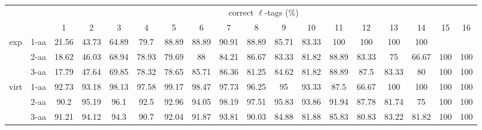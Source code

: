 \documentclass{article}[12pt]
\begin{document}
\begin{landscape}
\begin{table}[h]\tiny
\vspace{3mm}
{\centering
\begin{center}
\begin{tabular}{|c|l|c|c|c|c|c|c|c|c|c|c|c|c|c|c|c|c|}
  \hline
  \multicolumn{2}{|c|}{ } & \multicolumn{ 16 }{|c|}{ correct $\ell$-tags (\%)} \\
  \cline{3- 18}
  \multicolumn{2}{|c|}{ }  & 1 & 2 & 3 & 4 & 5 & 6 & 7 & 8 & 9 & 10 & 11 & 12 & 13 & 14 & 15 & 16\\
  \hline
  \multirow{3}{*}{exp}
&  1-aa  & 21.56 & 43.73 & 64.89 & 79.7 & 88.89 & 88.89 & 90.91 & 88.89 & 85.71 & 83.33 & 100 & 100 & 100 & 100 &  & \\
&  2-aa  & 18.62 & 46.03 & 68.94 & 78.93 & 79.69 & 88 & 84.21 & 86.67 & 83.33 & 81.82 & 88.89 & 83.33 & 75 & 66.67 & 100 & 100\\
&  3-aa  & 17.79 & 47.64 & 69.85 & 78.32 & 78.65 & 85.71 & 86.36 & 81.25 & 84.62 & 81.82 & 88.89 & 87.5 & 83.33 & 80 & 100 & 100\\
 \hline
  \multirow{3}{*}{virt} 
&  1-aa  & 92.73 & 93.18 & 98.13 & 97.58 & 99.17 & 98.47 & 97.73 & 96.25 & 95 & 93.33 & 87.5 & 66.67 & 100 & 100 & 100 & 100\\
&  2-aa  & 90.2 & 95.19 & 96.1 & 92.5 & 92.96 & 94.05 & 98.19 & 97.51 & 95.83 & 93.86 & 91.94 & 87.78 & 81.74 & 75 & 100 & 100\\
&  3-aa  & 91.21 & 94.12 & 94.3 & 90.7 & 92.04 & 91.87 & 93.81 & 90.03 & 84.88 & 81.88 & 85.83 & 80.83 & 83.22 & 81.82 & 100 & 100\\
 \hline
\end{tabular}
\end{center}
\par}
\centering
\vspace{3mm}
\end{table}


\end{landscape}
\end{document}
